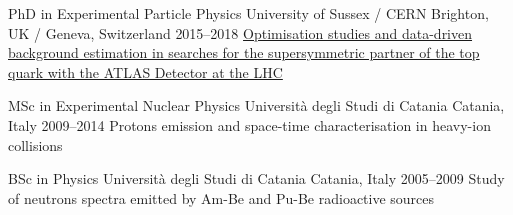 






\begin{cventries}

  \cventry
      {PhD in Experimental Particle Physics}
      {University of Sussex / CERN}
      {Brighton, UK / Geneva, Switzerland}
      {2015--2018}
      {
      \href{http://cds.cern.ch/record/2650559?ln=en}
      {Optimisation studies and data-driven background estimation in searches for the 
      supersymmetric partner of the top quark with the ATLAS Detector at the LHC}
      }

  \cventry
      {MSc in Experimental Nuclear Physics}
      {Università degli Studi di Catania}
      {Catania, Italy}
      {2009--2014}
      {Protons emission and space-time characterisation in heavy-ion collisions}
      
  \cventry
      {BSc in Physics}
      {Università degli Studi di Catania}
      {Catania, Italy}
      {2005--2009}
      {Study of neutrons spectra emitted by Am-Be and Pu-Be radioactive sources}
\end{cventries}